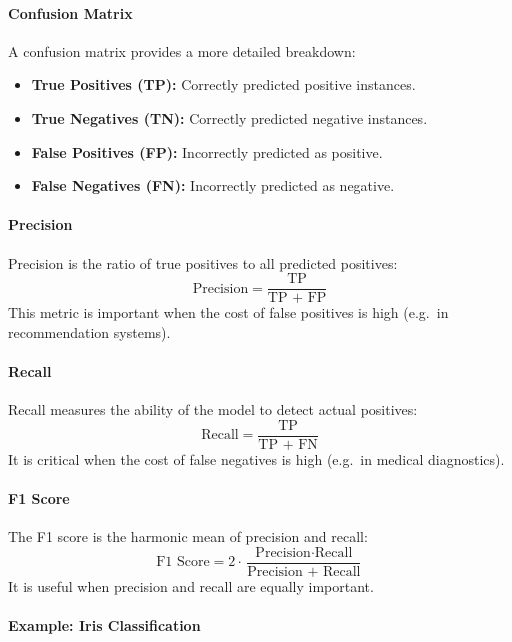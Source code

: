 \documentclass[9pt]{extarticle}
\begin{document}
\paragraph{Confusion Matrix}

A confusion matrix provides a more detailed breakdown:
\begin{itemize}
    \item \textbf{True Positives (TP):} Correctly predicted positive instances.
    \item \textbf{True Negatives (TN):} Correctly predicted negative instances.
    \item \textbf{False Positives (FP):} Incorrectly predicted as positive.
    \item \textbf{False Negatives (FN):} Incorrectly predicted as negative.
\end{itemize}

\paragraph{Precision}

Precision is the ratio of true positives to all predicted positives:
\[
\text{Precision} = \frac{\text{TP}}{\text{TP + FP}}
\]
This metric is important when the cost of false positives is high (e.g.\ in recommendation systems).

\paragraph{Recall}

Recall measures the ability of the model to detect actual positives:
\[
\text{Recall} = \frac{\text{TP}}{\text{TP + FN}}
\]
It is critical when the cost of false negatives is high (e.g.\ in medical diagnostics).

\paragraph{F1 Score}

The F1 score is the harmonic mean of precision and recall:
\[
\text{F1 Score} = 2 \cdot \frac{\text{Precision} \cdot \text{Recall}}{\text{Precision + Recall}}
\]
It is useful when precision and recall are equally important.

\paragraph{Example: Iris Classification}
\end{document}
